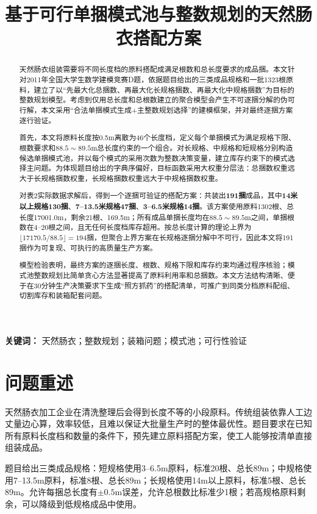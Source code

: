 \documentclass[UTF8,a4paper,12pt]{ctexart}
\title{基于可行单捆模式池与整数规划的天然肠衣搭配方案}
\author{}
\date{}
\begin{document}
\maketitle
\begin{abstract}
天然肠衣组装需要将不同长度档的原料搭配成满足根数和总长度要求的成品捆。本文针对2011年全国大学生数学建模竞赛D题，依据题目给出的三类成品规格和一批1323根原料，建立了以“先最大化总捆数、再最大化长规格捆数、再最大化中规格捆数”为目标的整数规划模型。考虑到仅用总长度和总根数建立的聚合模型会产生不可逐捆分解的伪可行解，本文采用“合法单捆模式生成+主整数规划选择”的建模框架，并对最终逐捆方案逐行验证。

首先，本文将原料长度按0.5m离散为46个长度档，定义每个单捆模式为满足规格下限、根数要求和$88.5\sim 89.5$m总长度约束的一个组合。对长规格、中规格和短规格分别构造候选单捆模式池，并以每个模式的采用次数为整数决策变量，建立库存约束下的模式选择主问题。为体现题目给出的字典序偏好，目标函数采用大权重分层法：总捆数权重远大于长规格捆数权重，长规格捆数权重远大于中规格捆数权重。

对表2实际数据求解后，得到一个逐捆可验证的搭配方案：共装出\textbf{191捆}成品，其中\textbf{14米以上规格130捆}、\textbf{7--13.5米规格47捆}、\textbf{3--6.5米规格14捆}。该方案使用原料1302根、总长度17001.0m，剩余21根、169.5m；所有成品单捆长度均在$88.5\sim 89.5$m之间，单捆根数在4--20根之间，且无任何长度档库存超用。按总长度计算的理论上界为$\lfloor17170.5/88.5\rfloor=194$捆，但聚合上界方案在长规格逐捆分解中不可行，因此本文将191捆作为可复现、可执行的高质量生产方案。

模型检验表明，最终方案的逐捆长度、根数、规格下限和库存约束均通过程序核验；模式池整数规划比简单贪心方法显著提高了原料利用率和总捆数。本文方法结构清晰、便于在30分钟生产决策要求下生成“照方抓药”的搭配清单，可推广到同类分档原料配组、切割库存和装箱配套问题。
\end{abstract}

\noindent\textbf{关键词：} 天然肠衣；整数规划；装箱问题；模式池；可行性验证

\newpage
\tableofcontents
\newpage

\section{问题重述}
天然肠衣加工企业在清洗整理后会得到长度不等的小段原料。传统组装依靠人工边丈量边心算，效率较低，且难以保证大批量生产时的整体最优性。题目要求在已知所有原料长度档和数量的条件下，预先建立原料搭配方案，使工人能够按清单直接组装成品。

题目给出三类成品规格：短规格使用3--6.5m原料，标准20根、总长89m；中规格使用7--13.5m原料，标准8根、总长89m；长规格使用14m以上原料，标准5根、总长89m。允许每捆总长度有$\pm0.5$m误差，允许总根数比标准少1根；若高规格原料剩余，可以降级到低规格成品中使用。
\end{document}
